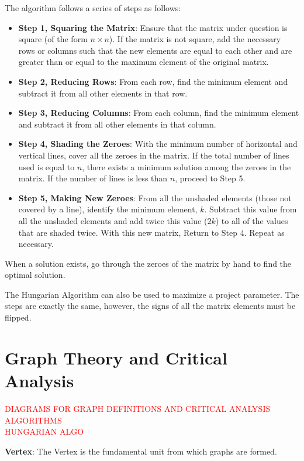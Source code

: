 \begin{defn} \label{mod1:defn:HungAlgSteps}
	The algorithm follows a series of steps as follows:
	\begin{itemize}
		\item \textbf{Step 1, Squaring the Matrix}: Ensure that the matrix under question is square (of the form $n\times n$). If the matrix is not square, add the necessary rows or columns such that the new elements are equal to each other and are greater than or equal to the maximum element of the original matrix.
		\item \textbf{Step 2, Reducing Rows}: From each row, find the minimum element and subtract it from all other elements in that row.
		\item \textbf{Step 3, Reducing Columns}: From each column, find the minimum element and subtract it from all other elements in that column.
		\item \textbf{Step 4, Shading the Zeroes}: With the minimum number of horizontal and vertical lines, cover all the zeroes in the matrix. If the total number of lines used is equal to $n$, there exists a minimum solution among the zeroes in the matrix. If the number of lines is less than $n$, proceed to Step 5. 
		\item \textbf{Step 5, Making New Zeroes}: From all the unshaded elements (those not covered by a line), identify the minimum element, $k$. Subtract this value from all the unshaded elements and add twice this value ($2k$) to all of the values that are shaded twice. With this new matrix, Return to Step 4. Repeat as necessary. \label{mod1:defn:HungAlgStep4}
	\end{itemize}
When a solution exists, go through the zeroes of the matrix by hand to find the optimal solution.
\end{defn}

\begin{note}
	The Hungarian Algorithm can also be used to maximize a project parameter. The steps are exactly the same, however, the signs of all the matrix elements must be flipped.	
\end{note}



\section{Graph Theory and Critical Analysis} \label{Module1:GraphTheoryCriticalAnalysis}

\textcolor{red} {DIAGRAMS FOR GRAPH DEFINITIONS  AND CRITICAL ANALYSIS ALGORITHMS}\\
\textcolor{red}{HUNGARIAN ALGO}
\begin{defn}\label{mod1:defn:Vertex}
   \textbf{Vertex}: The Vertex is the fundamental unit from which graphs are formed.
\end{defn}

